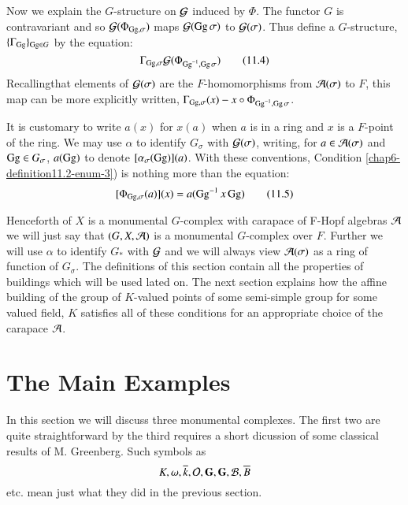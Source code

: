 Now we explain the $G$-structure on $\mathcal{G}$ induced by $\Phi$. The functor $G$ is contravariant and so $\mathcal{G}(\Phi_{\operatorname{Gg}, \sigma})$ maps $\mathcal{G}(\operatorname{Gg} \sigma)$ to $\mathcal{G}(\sigma)$. Thus define a $G$-structure, $\{\Gamma_{\operatorname{Gg}}\}_{\operatorname{Gg} \in G}$ by the equation:
\begin{equation*}\label{chap6-eq-11.4}
\Gamma_{\operatorname{Gg}, \sigma} \mathcal{G}(\Phi_{\operatorname{Gg}^{-1}, \operatorname{Gg} \sigma})\tag{11.4}
\end{equation*}
Recalling\pageoriginale that elements of $\mathcal{G}(\sigma)$ are the $F$-homomorphisms from $\mathcal{A}(\sigma)$ to $F$, this map can be more explicitly written, $\Gamma_{\operatorname{Gg}, \sigma}(x) - x \circ \Phi_{\operatorname{Gg}^{-1}, \operatorname{Gg} \sigma}$.

It is customary to write $a(x)$ for $x(a)$ when $a$ is in a ring and $x$ is a $F$-point of the ring. We may use $\alpha$ to identify $G_{\sigma}$ with $\mathcal{G}(\sigma)$, writing, for $a\in \mathcal{A}(\sigma)$ and $\operatorname{Gg} \in G_{\sigma}$, $a(\operatorname{Gg})$ to denote $[\alpha_{\sigma}(\operatorname{Gg})](a)$. With these conventions, Condition \ref{chap6-definition11.2-enum-3}) is nothing more than the equation: 
\begin{equation*}\label{chap6-eq-11.5}
[\Phi_{\operatorname{Gg}, \sigma}(a)](x) = a(\operatorname{Gg}^{-1}x \operatorname{Gg})\tag{11.5}
\end{equation*}

Henceforth of $X$ is a monumental $G$-complex with carapace of F-Hopf algebras $\mathcal{A}$ we will just say that $(G, X, \mathcal{A})$ is a monumental $G$-complex over $F$. Further we will use $\alpha$ to identify $G_{*}$ with $\mathcal{G}$ and we will always view $\mathcal{A}(\sigma)$ as a ring of function of $G_{\sigma}$. The definitions of this section contain all the properties of buildings which will be used lated on. The next section explains how the affine building of the group of $K$-valued points of some semi-simple group for some valued field, $K$ satisfies all of these conditions for an appropriate choice of the carapace $\mathcal{A}$.  

\section{The Main Examples}\label{chap6-sec-12}
 In this section we will discuss three monumental complexes. The first two are quite straightforward by the third requires a short dicussion of some classical results of M. Greenberg. Such symbols as 
$$
K, \omega, \overline{k}, \mathcal{O}, \mathbf{G}, \mathbf{G}, \mathcal{B}, \overline{B}
$$ 
etc. mean just what they did in the previous section.  

